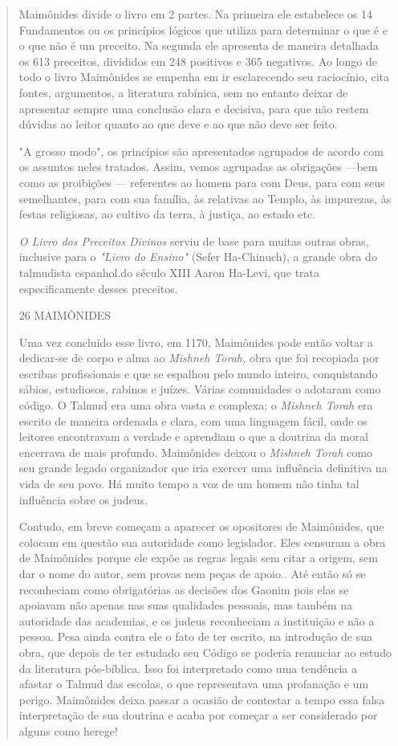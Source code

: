\begin{quote}
Maimônides divide o livro em 2 partes. Na primeira ele estabelece os 14
Fundamentos ou os princípios lógicos que utiliza para determinar o que é
e o que não é um preceito. Na segunda ele apresenta de maneira detalhada
os 613 preceitos, divididos em 248 positivos e 365 negativos. Ao longo
de to­do o livro Maimônides se empenha em ir esclarecendo seu
raciocínio, cita fon­tes, argumentos, a literatura rabínica, sem no
entanto deixar de apresentar sem­pre uma conclusão clara e decisiva,
para que não restem dúvidas ao leitor quanto ao que deve e ao que não
deve ser feito.

"A grosso modo", os princípios são apresentados agrupados de acor­do com
os assuntos neles tratados. Assim, vemos agrupadas as obrigações ---bem
como as proibições --- referentes ao homem para com Deus, para com seus
semelhantes, para com sua família, às relativas ao Templo, às impurezas,
às festas religiosas, ao cultivo da terra, à justiça, ao estado etc.

\emph{O Livro dos Preceitos Divinos} serviu de base para muitas outras
obras, inclusive para o \emph{"Livro do Ensino"} (Sefer Ha-Chinuch), a
grande obra do tal­mudista espanhol.do século XIII Aaron Ha-Levi, que
trata especificamente des­ses preceitos.

26 MAIMÔNIDES

Uma vez concluído esse livro, em 1170, Maimônides pode então vol­tar a
dedicar-se de corpo e alma ao \emph{Mishneh Torah,} obra que foi
recopiada por escribas profissionais e que se espalhou pelo mundo
inteiro, conquistando sá­bios, estudiosos, rabinos e juízes. Várias
comunidades o adotaram como códi­go. O Talmud era uma obra vasta e
complexa; o \emph{Mishneh Torah} era escrito de maneira ordenada e
clara, com uma linguagem fácil, onde os leitores encontra­vam a verdade
e aprendiam o que a doutrina da moral encerrava de mais pro­fundo.
Maimônides deixou o \emph{Mishneh Torah} como seu grande legado
organi­zador que iria exercer uma influência definitiva na vida de seu
povo. Há muito tempo a voz de um homem não tinha tal influência sobre os
judeus.

Contudo, em breve começam a aparecer os opositores de Maimôni­des, que
colocam em questão sua autoridade como legislador. Eles censuram a obra
de Maimônides porque ele expõe as regras legais sem citar a origem, sem
dar o nome do autor, sem provas nem peças de apoio.. Até então só se
reconhe­ciam como obrigatórias as decisões dos Gaonim pois elas se
apoiavam não ape­nas nas suas qualidades pessoais, mas também na
autoridade das academias, e os judeus reconheciam a instituição e não a
pessoa. Pesa ainda contra ele o fato de ter escrito, na introdução de
sua obra, que depois de ter estudado seu Códi­go se poderia renunciar ao
estudo da literatura pós-bíblica. Isso foi interpreta­do como uma
tendência a afastar o Talmud das escolas, o que representava uma
profanação e um perigo. Maimônides deixa passar a ocasião de contestar a
tem­po essa falsa interpretação de sua doutrina e acaba por começar a
ser conside­rado por alguns como herege!


\end{quote}
